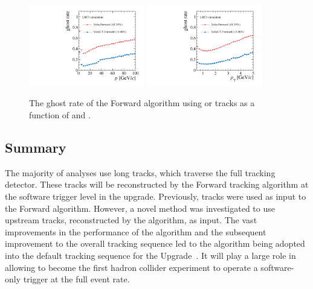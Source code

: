 \begin{figure}[!tb]
\centering
\includegraphics[width=0.45\textwidth]{figs/upstream-tracking-upgrade/fwd_gr_p_comp.pdf}
\includegraphics[width=0.45\textwidth]{figs/upstream-tracking-upgrade/fwd_gr_pt_comp.pdf}
\caption{The ghost rate of the Forward algorithm using \velo or \velout tracks as a function of \ptot and \pt.}
\label{fig:gr_fwd_comp}
\end{figure}

\subsection{Summary}

The majority of \lhcb analyses use long tracks, which traverse the full tracking detector. These tracks will be reconstructed by the Forward tracking algorithm at the software trigger level in the \lhcb upgrade. Previously, \velo tracks were used as input to the Forward algorithm. However, a novel method was investigated to use upstream tracks, reconstructed by the \velout algorithm, as input. The vast improvements in the performance of the \velout algorithm and the subsequent improvement to the overall tracking sequence led to the algorithm being adopted into the default tracking sequence for the \lhcb Upgrade~\cite{upgrade-trigger-tdr,upgrade-tracker-tdr}. It will play a large role in allowing \lhcb to become the first hadron collider experiment to operate a software-only trigger at the full event rate.

